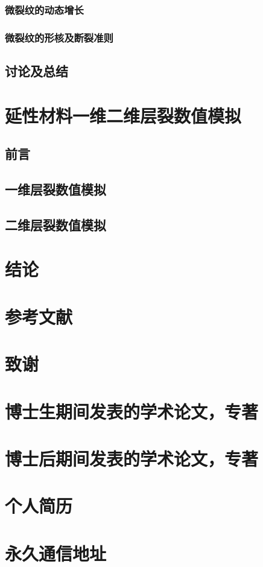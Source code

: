\documentclass[degree=postdoc]{sysuthesis}
\begin{document}
\subsection{微裂纹的动态增长}

\clearpage
\setcounter{page}{124}
\subsection{微裂纹的形核及断裂准则}

\clearpage
\setcounter{page}{125}
\section{讨论及总结}

\clearpage
\setcounter{page}{126}
\chapter{延性材料一维二维层裂数值模拟}
\section{前言}

\clearpage
\setcounter{page}{127}
\section{一维层裂数值模拟}

\clearpage
\setcounter{page}{129}
\section{二维层裂数值模拟}

\clearpage
\setcounter{page}{138}
\chapter{结论}



\backmatter
\setcounter{page}{148}
\chapter{参考文献}
\chapter{致谢}

\clearpage
\setcounter{page}{149}
\chapter{博士生期间发表的学术论文，专著}

\clearpage
\setcounter{page}{150}
\chapter{博士后期间发表的学术论文，专著}

\clearpage
\setcounter{page}{151}
\chapter{个人简历}

\clearpage
\setcounter{page}{152}
\chapter{永久通信地址}


\clearpage
\OMIT
\end{document}
